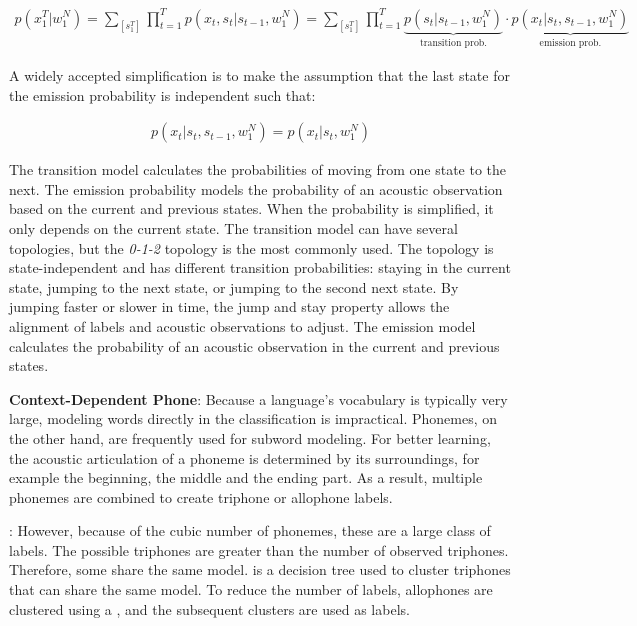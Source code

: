 \begin{align}
	\label{eq:hmm}
	p(x_1^T|w_1^N) = \sum_{[s_1^T]}\prod_{t=1}^Tp(x_t, s_t|s_{t-1}, w_1^N) =
	\sum_{[s_1^T]}\prod_{t=1}^T\underbrace{p(s_t|s_{t-1}, w_1^N)}_{\text{transition prob.}}\cdot
	\underbrace{p(x_t|s_t, s_{t-1}, w_1^N)}_{\text{emission prob.}}
\end{align}

A widely accepted simplification is to make the assumption that the last state for the emission probability is independent such that:

\begin{align}
	\label{eq:simplify_hmm}
	p(x_t|s_t, s_{t-1}, w_1^N) = p(x_t|s_t, w_1^N)
\end{align}

The transition model calculates the probabilities of moving from one state to the next. 
The emission probability models the probability of an acoustic observation based on the current and previous states. 
When the probability is simplified, it only depends on the current state.
The transition model can have several topologies, but the \textit{0-1-2} topology is the most commonly used.
The topology is state-independent and has different transition probabilities: staying in the current state, jumping to the next state, or jumping to the second next state.
By jumping faster or slower in time, the jump and stay property allows the alignment of labels and acoustic observations to adjust.
The emission model calculates the probability of an acoustic observation in the current and previous states.

\textbf{Context-Dependent Phone}: Because a language's vocabulary is typically very large, modeling words directly in the classification is impractical.
Phonemes, on the other hand, are frequently used for subword modeling.
For better learning, the acoustic articulation of a phoneme is determined by its surroundings, for example  the beginning, the middle and the ending part.
As a result, multiple phonemes are combined to create triphone or allophone labels.

\textbf{} \cite{Beulen98automaticquestion}: However, because of the cubic number of phonemes, these are a large class of labels. 
The possible triphones are greater than the number of observed triphones.
Therefore, some share the same  model.
 is a decision tree used to cluster triphones that can share the same  model.
To reduce the number of labels, allophones are clustered using a , and the subsequent clusters are used as labels.

